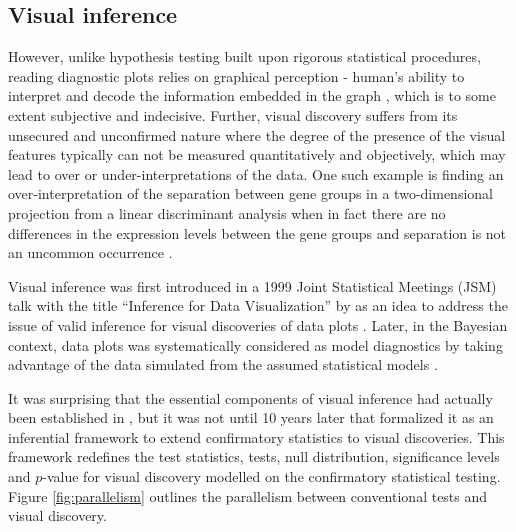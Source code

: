 \documentclass[]{interact}
\theoremstyle{plain}%
\theoremstyle{definition}
\theoremstyle{remark}
\begin{document}
\hypertarget{visual-inference}{%
\subsection{Visual inference}\label{visual-inference}}

However, unlike hypothesis testing built upon rigorous statistical
procedures, reading diagnostic plots relies on graphical perception -
human's ability to interpret and decode the information embedded in the
graph \citep{cleveland_graphical_1984}, which is to some extent
subjective and indecisive. Further, visual discovery suffers from its
unsecured and unconfirmed nature where the degree of the presence of the
visual features typically can not be measured quantitatively and
objectively, which may lead to over or under-interpretations of the
data. One such example is finding an over-interpretation of the
separation between gene groups in a two-dimensional projection from a
linear discriminant analysis when in fact there are no differences in
the expression levels between the gene groups and separation is not an
uncommon occurrence \citep{roy_chowdhury_using_2015}.

Visual inference was first introduced in a 1999 Joint Statistical
Meetings (JSM) talk with the title ``Inference for Data Visualization''
by \citet{buja_inference_1999} as an idea to address the issue of valid
inference for visual discoveries of data plots
\citep{gelman_exploratory_2004}. Later, in the Bayesian context, data
plots was systematically considered as model diagnostics by taking
advantage of the data simulated from the assumed statistical models
\citep{gelman_bayesian_2003, gelman_exploratory_2004}.

It was surprising that the essential components of visual inference had
actually been established in \citet{buja_inference_1999}, but it was not
until 10 years later that \citet{buja_statistical_2009} formalized it as
an inferential framework to extend confirmatory statistics to visual
discoveries. This framework redefines the test statistics, tests, null
distribution, significance levels and \(p\)-value for visual discovery
modelled on the confirmatory statistical testing. Figure
\ref{fig:parallelism} outlines the parallelism between conventional
tests and visual discovery.
\end{document}
